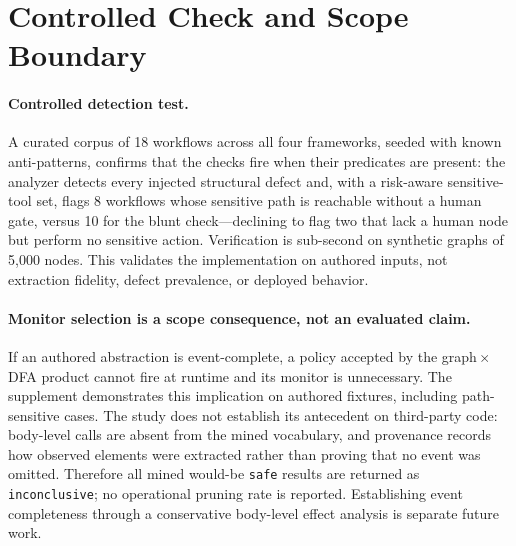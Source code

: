 \section{Controlled Check and Scope Boundary}
\label{sec:results}
\label{sec:pruning}

\paragraph{Controlled detection test.}
A curated corpus of 18 workflows across all four frameworks, seeded with known
anti-patterns, confirms that the checks fire when their predicates are present:
the analyzer detects every injected structural defect and, with a risk-aware
sensitive-tool set, flags 8 workflows whose sensitive path is reachable without
a human gate, versus 10 for the blunt check---declining to flag two that lack a
human node but perform no sensitive action. Verification is sub-second on
synthetic graphs of 5{,}000 nodes. This validates the implementation on authored
inputs, not extraction fidelity, defect prevalence, or deployed behavior.

\paragraph{Monitor selection is a scope consequence, not an evaluated claim.}
If an authored abstraction is event-complete, a policy accepted by the
graph\,$\times$\,DFA product cannot fire at runtime and its monitor is
unnecessary. The supplement demonstrates this implication on authored
fixtures, including path-sensitive cases. The study does not establish its
antecedent on third-party code: body-level calls are absent from the mined
vocabulary, and provenance records how observed elements were extracted rather
than proving that no event was omitted. Therefore all mined would-be
\texttt{safe} results are returned as \texttt{inconclusive}; no operational
pruning rate is reported. Establishing event completeness through a
conservative body-level effect analysis is separate future work.
